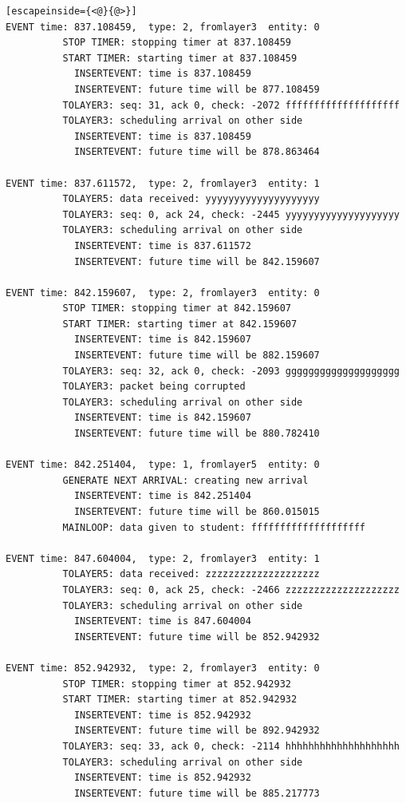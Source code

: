 \documentclass[paper=a4, fontsize=11pt]{scrartcl}
\numberwithin{equation}{section}		%
\numberwithin{figure}{section}			%
\numberwithin{table}{section}				%
\begin{document}
\begin{lstlisting}[escapeinside={<@}{@>}]
EVENT time: 837.108459,  type: 2, fromlayer3  entity: 0
          STOP TIMER: stopping timer at 837.108459
          START TIMER: starting timer at 837.108459
            INSERTEVENT: time is 837.108459
            INSERTEVENT: future time will be 877.108459
          TOLAYER3: seq: 31, ack 0, check: -2072 ffffffffffffffffffff
          TOLAYER3: scheduling arrival on other side
            INSERTEVENT: time is 837.108459
            INSERTEVENT: future time will be 878.863464

EVENT time: 837.611572,  type: 2, fromlayer3  entity: 1
          TOLAYER5: data received: yyyyyyyyyyyyyyyyyyyy
          TOLAYER3: seq: 0, ack 24, check: -2445 yyyyyyyyyyyyyyyyyyyy
          TOLAYER3: scheduling arrival on other side
            INSERTEVENT: time is 837.611572
            INSERTEVENT: future time will be 842.159607

EVENT time: 842.159607,  type: 2, fromlayer3  entity: 0
          STOP TIMER: stopping timer at 842.159607
          START TIMER: starting timer at 842.159607
            INSERTEVENT: time is 842.159607
            INSERTEVENT: future time will be 882.159607
          TOLAYER3: seq: 32, ack 0, check: -2093 gggggggggggggggggggg
          TOLAYER3: packet being corrupted
          TOLAYER3: scheduling arrival on other side
            INSERTEVENT: time is 842.159607
            INSERTEVENT: future time will be 880.782410

EVENT time: 842.251404,  type: 1, fromlayer5  entity: 0
          GENERATE NEXT ARRIVAL: creating new arrival
            INSERTEVENT: time is 842.251404
            INSERTEVENT: future time will be 860.015015
          MAINLOOP: data given to student: ffffffffffffffffffff

EVENT time: 847.604004,  type: 2, fromlayer3  entity: 1
          TOLAYER5: data received: zzzzzzzzzzzzzzzzzzzz
          TOLAYER3: seq: 0, ack 25, check: -2466 zzzzzzzzzzzzzzzzzzzz
          TOLAYER3: scheduling arrival on other side
            INSERTEVENT: time is 847.604004
            INSERTEVENT: future time will be 852.942932

EVENT time: 852.942932,  type: 2, fromlayer3  entity: 0
          STOP TIMER: stopping timer at 852.942932
          START TIMER: starting timer at 852.942932
            INSERTEVENT: time is 852.942932
            INSERTEVENT: future time will be 892.942932
          TOLAYER3: seq: 33, ack 0, check: -2114 hhhhhhhhhhhhhhhhhhhh
          TOLAYER3: scheduling arrival on other side
            INSERTEVENT: time is 852.942932
            INSERTEVENT: future time will be 885.217773


\end{lstlisting}
\end{document}
